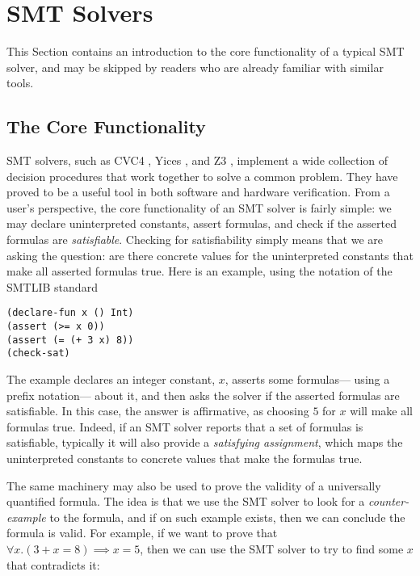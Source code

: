\documentclass{sigplanconf}
\begin{document}
\section {SMT Solvers}
\label{smt}

This Section contains an introduction to the core functionality
of a typical SMT solver, and may be skipped by readers who are already
familiar with similar tools.

\subsection{The Core Functionality}

SMT solvers, such as CVC4 \cite{cvc4}, Yices \cite{yices}, and Z3
\cite{z3}, implement a wide collection of decision procedures that
work together to solve a common problem.  They have proved to be a useful
tool in both software and hardware verification.
From a user's perspective, the core functionality of an SMT solver is fairly
simple: we may declare uninterpreted constants, assert formulas,
and check if the asserted formulas are {\em satisfiable}.  Checking
for satisfiability simply means that we are asking the
question: are there concrete values for the uninterpreted constants
that make all asserted formulas true.  Here is an example, using
the notation of the SMTLIB standard \cite{smtlib2}

\begin{Verbatim}
(declare-fun x () Int)
(assert (>= x 0))
(assert (= (+ 3 x) 8))
(check-sat)
\end{Verbatim}

The example declares an integer constant, $x$, asserts some formulas---%
using a prefix notation---%
about it, and then asks the solver if the asserted formulas are
satisfiable.  In this case, the answer is affirmative, as choosing
$5$ for $x$ will make all formulas true.  Indeed, if an
SMT solver reports that a set of formulas is satisfiable, typically
it will also provide a {\em satisfying assignment}, which maps
the uninterpreted constants to concrete values that make the
formulas true.

The same machinery may also be used to prove the validity of
a universally quantified formula. The idea is that we use the SMT solver
to look for a {\em counter-example} to the formula, and if on such
example exists, then we can conclude the formula is valid.
For example, if we want to prove that $\forall x. (3 + x = 8) \implies x = 5$,
then we can use the SMT solver to try to find some $x$ that contradicts it:
\end{document}
